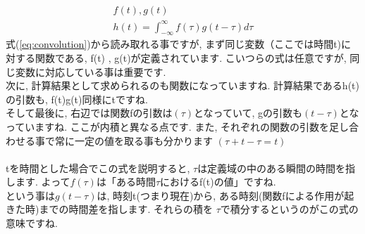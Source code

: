 \documentclass[11pt,a4paper]{jreport}
\begin{document}
\begin{eqnarray}
\label{eq:convolution}
f(t) , g(t)\\
h(t) = \int^{\infty}_{-\infty} f(\tau) g(t - \tau) d\tau
\end{eqnarray}
式(\ref{eq:convolution})から読み取れる事ですが, まず同じ変数（ここでは時間t)に対する関数である, f(t) , g(t)が定義されています. こいつらの式は任意ですが, 同じ変数に対応している事は重要です. \\
次に, 計算結果として求められるのも関数になっていますね. 計算結果であるh(t)の引数も, f(t)g(t)同様にtですね.\\
そして最後に, 右辺では関数fの引数は$(\tau)$となっていて, gの引数も$(t - \tau)$となっていますね. ここが内積と異なる点です. また, それぞれの関数の引数を足し合わせる事で常に一定の値を取る事も分かります $(\tau + t - \tau = t)$\\
\\
tを時間とした場合でこの式を説明すると, $\tau$は定義域の中のある瞬間の時間を指します. よって$f(\tau)$は「ある時間$\tau$におけるf(t)の値」ですね.\\
という事は$g(t-\tau)$は, 時刻t(つまり現在)から, ある時刻(関数fによる作用が起きた時)までの時間差を指します. それらの積を $\tau$で積分するというのがこの式の意味ですね.\\
\\
\\
\end{document}
